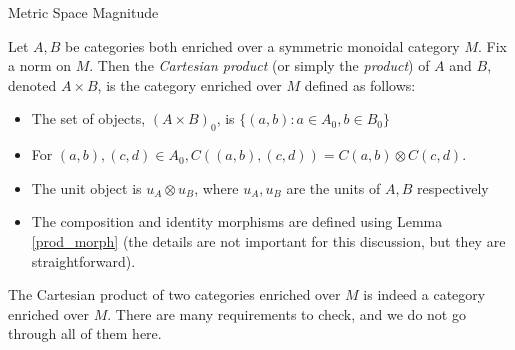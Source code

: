 \documentclass[12pt]{pom_thesis}
\begin{document}
\begin{chapter}{Metric Space Magnitude}
\begin{defn}

Let $A,B$ be categories both enriched over a symmetric monoidal category $M$. Fix a norm on $M$. Then the \emph{Cartesian product} (or simply the \emph{product}) of $A$ and $B$, denoted $A \times B$, is the category enriched over $M$ defined as follows:
\begin{itemize}
\item The set of objects, $(A \times B)_0$, is $\{(a,b):a \in A_0, b \in  B_0\}$
\item For $(a,b), (c,d) \in A_0, C((a,b), (c,d)) = C(a,b) \otimes C(c,d)$.
\item The unit object is $u_A \otimes u_B$, where $u_A, u_B$ are the units of $A,B$ respectively
\item The composition and identity morphisms are defined using Lemma \ref{prod_morph} (the details are not important for this discussion, but they are straightforward).
\end{itemize}
\begin{rmk}
The Cartesian product of two categories enriched over $M$ is indeed a category enriched over $M$. There are many requirements to check, and we do not go through all of them here.
\end{rmk}
\end{defn}


\end{chapter}
\end{document}
